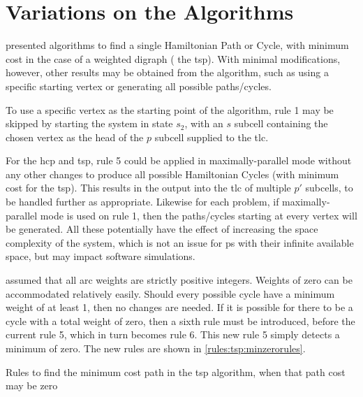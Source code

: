 \section{\label{sec:tsp:variations}Variations on the Algorithms}
 presented algorithms to find a single Hamiltonian Path or Cycle, with minimum cost in the case of a weighted digraph (\ie{} the \gls{tsp}).  With minimal modifications, however, other results may be obtained from the algorithm, such as using a specific starting vertex or generating all possible paths/cycles.

To use a specific vertex as the starting point of the algorithm, rule 1 may be skipped by starting the system in state \(s_2\), with an \(s\) subcell containing the chosen vertex as the head of the \(p\) subcell supplied to the \gls{tlc}.

For the \gls{hcp} and \gls{tsp}, rule 5 could be applied in maximally-parallel mode without any other changes to produce all possible Hamiltonian Cycles (with minimum cost for the \gls{tsp}).  This results in the output into the \gls{tlc} of multiple \(p'\) subcells, to be handled further as appropriate.  Likewise for each problem, if maximally-parallel mode is used on rule 1, then the paths/cycles starting at every vertex will be generated.  All these potentially have the effect of increasing the space complexity of the system, which is not an issue for \gls{ps} with their infinite available space, but may impact software simulations.

 assumed that all arc weights are strictly positive integers.  Weights of zero can be accommodated relatively easily.  Should every possible cycle have a minimum weight of at least 1, then no changes are needed.  If it is possible for there to be a cycle with a total weight of zero, then a sixth rule must be introduced, before the current rule 5, which in turn becomes rule 6.  This new rule 5 simply detects a minimum of zero.  The new rules are shown in \cref{rules:tsp:minzerorules}.


\begin{cprulesetfloat}
\begin{cpruleset}
    
    
\end{cpruleset}
\caption[Rules to find the minimum cost path when it may be zero]{\label{rules:tsp:minzerorules}Rules to find the minimum cost path in the \gls{tsp} algorithm, when that path cost may be zero}
\end{cprulesetfloat}